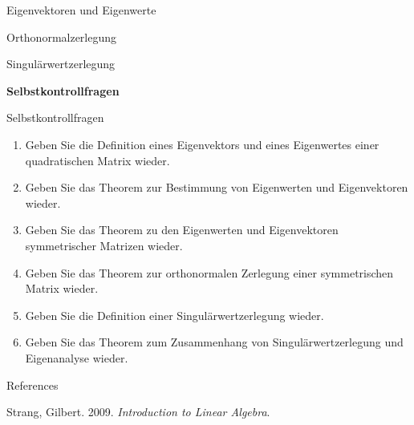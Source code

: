 \documentclass[
  8pt,
  ignorenonframetext,
]{beamer}
\newlength{\cslhangindent}
\newlength{\cslentryspacingunit} %
\newenvironment{CSLReferences}[2] %
 {%
  \setlength{\parindent}{0pt}
  \ifodd #1
  \let\oldpar\par
  \def\par{\hangindent=\cslhangindent\oldpar}
  \fi
  \setlength{\parskip}{#2\cslentryspacingunit}
 }%
 {}
\begin{document}
\begin{frame}{}
\protect\hypertarget{section-6}{}
\vfill
{}
\Large

Eigenvektoren und Eigenwerte

Orthonormalzerlegung

Singulärwertzerlegung

\textbf{Selbstkontrollfragen} \vfill 
\end{frame}

\begin{frame}{Selbstkontrollfragen}
\protect\hypertarget{selbstkontrollfragen}{}
\footnotesize
{}
\begin{enumerate}
\item Geben Sie die Definition eines Eigenvektors und eines Eigenwertes einer quadratischen Matrix wieder.
\item Geben Sie das Theorem zur Bestimmung von Eigenwerten und Eigenvektoren wieder.
\item Geben Sie das Theorem zu den Eigenwerten und Eigenvektoren symmetrischer Matrizen wieder.
\item Geben Sie das Theorem zur orthonormalen Zerlegung einer symmetrischen Matrix wieder.
\item Geben Sie die Definition einer Singulärwertzerlegung wieder.
\item Geben Sie das Theorem zum Zusammenhang von Singulärwertzerlegung und Eigenanalyse wieder.
\end{enumerate}
\end{frame}

\begin{frame}{References}
\protect\hypertarget{references}{}
\footnotesize

\hypertarget{refs}{}
\begin{CSLReferences}{1}{0}
\leavevmode{}%
Strang, Gilbert. 2009. \emph{Introduction to {Linear Algebra}}.

\end{CSLReferences}
\end{frame}
\end{document}
